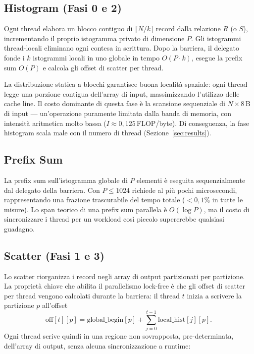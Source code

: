 \documentclass[10pt,a4paper,twocolumn]{article}
\begin{document}
\subsection*{Histogram (Fasi 0 e 2)}

Ogni thread elabora un blocco contiguo di $\lceil N/k \rceil$ record dalla relazione $R$ (o $S$), incrementando il proprio istogramma privato di dimensione $P$. Gli istogrammi thread-locali eliminano ogni contesa in scrittura. Dopo la barriera, il delegato fonde i $k$ istogrammi locali in uno globale in tempo $O(P \cdot k)$, esegue la prefix sum $O(P)$ e calcola gli offset di scatter per thread.

La distribuzione statica a blocchi garantisce buona località spaziale: ogni thread legge una porzione contigua dell'array di input, massimizzando l'utilizzo delle cache line. Il costo dominante di questa fase è la scansione sequenziale di $N \times 8$\,B di input --- un'operazione puramente limitata dalla banda di memoria, con intensità aritmetica molto bassa ($I \approx 0{,}125$\,FLOP/byte). Di conseguenza, la fase histogram scala male con il numero di thread (Sezione~\ref{sec:results}).

\subsection*{Prefix Sum}

La prefix sum sull'istogramma globale di $P$ elementi è eseguita sequenzialmente dal delegato della barriera. Con $P \leq 1024$ richiede al più pochi microsecondi, rappresentando una frazione trascurabile del tempo totale ($< 0{,}1\%$ in tutte le misure). Lo span teorico di una prefix sum parallela è $O(\log P)$, ma il costo di sincronizzare i thread per un workload così piccolo supererebbe qualsiasi guadagno.

\subsection*{Scatter (Fasi 1 e 3)}

Lo scatter riorganizza i record negli array di output partizionati per partizione. La proprietà chiave che abilita il parallelismo lock-free è che gli offset di scatter per thread vengono calcolati durante la barriera: il thread $t$ inizia a scrivere la partizione $p$ all'offset
\[
  \text{off}[t][p] = \text{global\_begin}[p] + \sum_{j=0}^{t-1} \text{local\_hist}[j][p].
\]
Ogni thread scrive quindi in una regione non sovrapposta, pre-determinata, dell'array di output, senza alcuna sincronizzazione a runtime:
\end{document}
